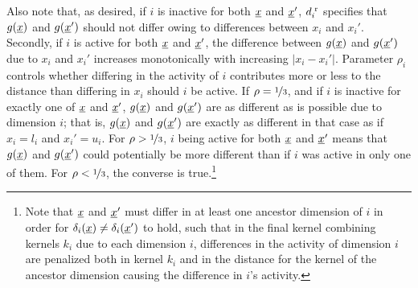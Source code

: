\documentclass[letterpaper]{article}
\newcommand{\vect}[1]{\underline{\smash{#1}}}
\renewcommand{\v}[1]{\vect{#1}}
\newcommand{\br}{^{\text{\textnormal{ r}}}}
\newcommand{\note}[1]{}
\renewcommand{\note}[1]{~\\\frame{\begin{minipage}[c]{\textwidth}\vspace{2pt}\center{#1}\vspace{2pt}\end{minipage}}\vspace{3pt}\\}
\begin{document}
Also note that, as desired, if $i$ is inactive for both $\v{x}$ and $\v{x}'$, $d\br_i$ specifies that $g(\v{x})$ and $g(\v{x}')$ should not differ owing to differences between $x_i$ and $x_i'$. Secondly, if $i$ is active for both $\v{x}$ and $\v{x}'$, the difference between $g(\v{x})$ and $g(\v{x}')$ due to $x_i$ and $x_i'$ increases monotonically with increasing $\left|x_i-x_i'\right|$. Parameter $\rho_i$ controls whether differing in the activity of $i$ contributes more or less to the distance than differing in $x_i$ should $i$ be active. If $\rho = \nicefrac{1}{3}$, and if $i$ is inactive for exactly one of $\v{x}$ and $\v{x}'$, $g(\v{x})$ and $g(\v{x}')$ are as different as is possible due to dimension $i$; that is, $g(\v{x})$ and $g(\v{x}')$ are exactly as different in that case as if $x_i=l_i$ and $x_i'=u_i$. For $\rho>\nicefrac{1}{3}$, $i$ being active for both $\v{x}$ and $\v{x}'$ means that $g(\v{x})$ and $g(\v{x}')$ could potentially be more different than if
$i$ was active in only one of them. For $\rho<\nicefrac{1}{3}$, the converse is true.\footnote{Note that $\v{x}$ and $\v{x}'$ must differ in at least one ancestor dimension of $i$ in order for $\delta_i(\v{x}) \neq \delta_i(\v{x}')$ to hold, such that in the final kernel combining kernels $k_i$ due to each dimension $i$, differences in the activity of dimension $i$ are penalized both in kernel $k_i$ and in the distance for the kernel of the ancestor dimension causing the difference in $i$'s activity.}
\end{document}
